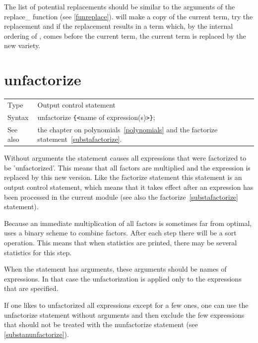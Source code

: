 \noindent The list of potential replacements should be 
similar to the arguments of the replace\_ 
function (see \ref{funreplace}). {\FORM} will 
make a copy of the current term, try the replacement and if the replacement 
results in a term which, by the internal ordering of {\FORM}, comes before 
the current term, the current term is replaced by the new variety. 
\vspace{10mm}


\section{unfactorize}
\label{substaunfactorize}

\noindent \begin{tabular}{ll}
Type & Output control statement\\
Syntax & unfactorize \verb:{:{\tt<}name of expression(s){\tt>}\verb:}:;
\\ See also & the chapter on polynomials~\ref{polynomials} and the 
factorize statement~\ref{substafactorize}.
\end{tabular} \vspace{4mm}

\noindent Without arguments the statement causes all expressions that were 
factorized to be 'unfactorized'. This means that all factors are multiplied 
and the expression is replaced by this new version. Like the factorize 
statement this statement is an output control statement, which means that 
it takes effect after an expression has been processed in the current 
module (see also the factorize~\ref{substafactorize} statement).

\noindent Because an immediate multiplication of all factors is sometimes 
far from optimal, \FORM{} uses a binary scheme to combine factors. After each 
step there will be a sort operation. This means that when statistics are 
printed, there may be several statistics for this step.

\noindent When the statement has arguments, these arguments should be names 
of expressions. In that case the unfactorization is applied only to the 
expressions that are specified.

\noindent If one likes to unfactorized all expressions except for a few 
ones, one can use the unfactorize statement without arguments and then 
exclude the few expressions that should not be treated with the 
nunfactorize statement (see \ref{substanunfactorize}).
\vspace{10mm} 

